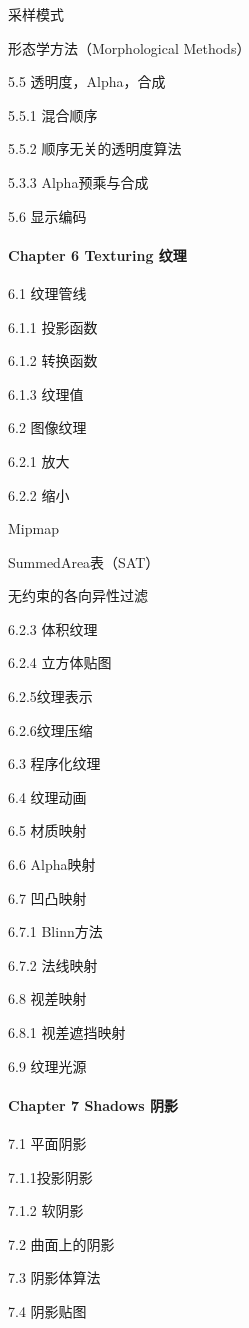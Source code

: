 \documentclass[
  paper=a4,
  ,captions=tableheading
]{scrartcl}
\begin{document}
采样模式

形态学方法（Morphological Methods）

5.5 透明度，Alpha，合成

5.5.1 混合顺序

5.5.2 顺序无关的透明度算法

5.3.3 Alpha预乘与合成

5.6 显示编码

\paragraph{Chapter 6 Texturing
纹理}\label{chapter-6-texturing-ux7eb9ux7406}

6.1 纹理管线

6.1.1 投影函数

6.1.2 转换函数

6.1.3 纹理值

6.2 图像纹理

6.2.1 放大

6.2.2 缩小

Mipmap

SummedArea表（SAT）

无约束的各向异性过滤

6.2.3 体积纹理

6.2.4 立方体贴图

6.2.5纹理表示

6.2.6纹理压缩

6.3 程序化纹理

6.4 纹理动画

6.5 材质映射

6.6 Alpha映射

6.7 凹凸映射

6.7.1 Blinn方法

6.7.2 法线映射

6.8 视差映射

6.8.1 视差遮挡映射

6.9 纹理光源

\paragraph{Chapter 7 Shadows 阴影}\label{chapter-7-shadows-ux9634ux5f71}

7.1 平面阴影

7.1.1投影阴影

7.1.2 软阴影

7.2 曲面上的阴影

7.3 阴影体算法

7.4 阴影贴图
\end{document}
